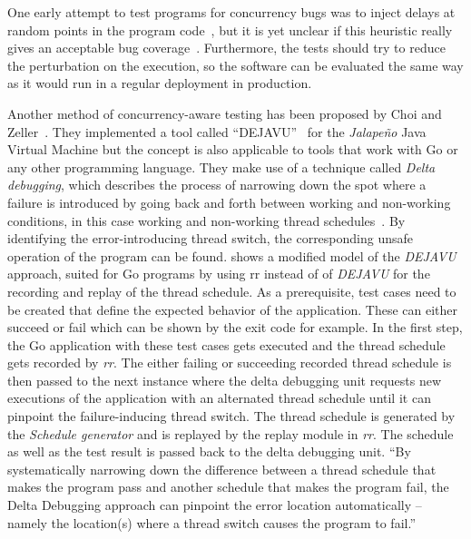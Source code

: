 \documentclass[english]{lni}
\begin{document}
One early attempt to test programs for concurrency bugs was to inject delays at random points in the program code~\cite{bron2005coverage}, but it is yet unclear if this heuristic really gives an acceptable bug coverage~\cite{lu2008mistakes}.
Furthermore, the tests should try to reduce the perturbation on the execution, so the software can be evaluated the same way as it would run in a regular deployment in production.

Another method of concurrency-aware testing has been proposed by Choi and Zeller~\cite{acm2002}.
They implemented a tool called ``DEJAVU''~\cite{acm2002} for the \emph{Jalapeño} Java Virtual Machine but the concept is also applicable to tools that work with Go or any other programming language.
They make use of a technique called \emph{Delta debugging}, which describes the process of narrowing down the spot where a failure is introduced by going back and forth between working and non-working conditions, in this case working and non-working thread schedules~\cite{zeller2002delta}.
By identifying the error-introducing thread switch, the corresponding unsafe operation of the program can be found.
 shows a modified model of the \emph{DEJAVU} approach, suited for Go programs by using rr instead of of \emph{DEJAVU} for the recording and replay of the thread schedule.
As a prerequisite, test cases need to be created that define the expected behavior of the application.
These can either succeed or fail which can be shown by the exit code for example.
In the first step, the Go application with these test cases gets executed and the thread schedule gets recorded by \emph{rr}.
The either failing or succeeding recorded thread schedule is then passed to the next instance where the delta debugging unit requests new executions of the application with an alternated thread schedule until it can pinpoint the failure-inducing thread switch.
The thread schedule is generated by the \emph{Schedule generator} and is replayed by the replay module in \emph{rr}.
The schedule as well as the test result is passed back to the delta debugging unit.
``By systematically narrowing down the difference between a thread schedule that makes the program pass and another schedule that makes the program fail, the Delta Debugging approach can pinpoint the error location automatically -- namely the location(s) where a thread switch causes the program to fail.''~\cite{acm2002}
\end{document}
